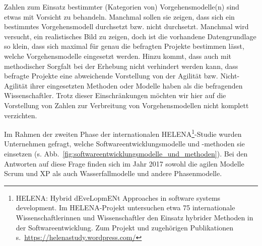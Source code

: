 \vspace{4mm} %

\label{sec:Kap-2.3:heutigeVM}

\vspace{1mm} %

Zahlen zum Einsatz bestimmter (Kategorien von) Vorgehensmodelle(n) sind etwas mit Vorsicht zu behandeln. Manchmal sollen sie zeigen, dass sich ein bestimmtes Vorgehensmodell durchsetzt bzw. nicht durchsetzt. Manchmal wird versucht, ein realistisches Bild zu zeigen, doch ist die vorhandene Datengrundlage so klein, dass sich maximal für genau die befragten Projekte bestimmen lässt, welche Vorgehensmodelle eingesetzt werden. Hinzu kommt, dass auch mit methodischer Sorgfalt bei der Erhebung nicht verhindert werden kann, dass befragte Projekte eine abweichende Vorstellung von der Agilität bzw. Nicht-Agilität ihrer eingesetzten Methoden oder Modelle haben als die befragenden Wissenschaftler. Trotz dieser Einschränkungen möchten wir hier auf die Vorstellung von Zahlen zur Verbreitung von Vorgehens\-modellen nicht komplett verzichten.

Im Rahmen der zweiten Phase der internationalen HELENA\footnote{HELENA: Hybrid dEveLopmENt Approaches in software systems development. Im HELENA-Projekt untersuchen etwa 75 internationale Wissenschaftlerinnen und Wissenschaftler den Einsatz hybrider Methoden in der Softwareentwicklung. Zum Projekt und zugehörigen Publikationen \mbox{s.~\href{https://helenastudy.wordpress.com/}{https://helenastudy.wordpress.com/}}}-Studie \cite{kuh18} wurden Unternehmen gefragt, welche Softwareentwicklungsmodelle und -methoden sie einsetzen (s. Abb.~\ref{fig:softwareentwicklungsmodelle_und_methoden}). Bei den Antworten auf diese Frage finden sich im Jahr 2017 sowohl die agilen Modelle Scrum und XP als auch Wasserfallmodelle und andere Phasenmodelle.

